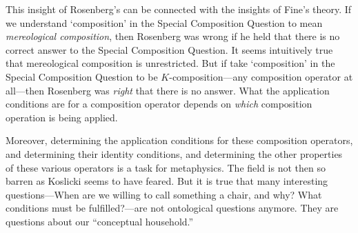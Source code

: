 \documentclass[11pt]{article}
\begin{document}
\begin{spacing}{1.5}
This insight of Rosenberg's can be connected with the insights of
Fine's theory.  If we understand `composition' in the Special
Composition Question to mean {\em mereological composition}, then
Rosenberg was wrong if he held that there is no correct answer to the
Special Composition Question.  It seems intuitively true that
mereological composition is unrestricted.  But if take `composition'
in the Special Composition Question to be $K$-composition---any
composition operator at all---then Rosenberg was {\em right} that
there is no answer.  What the application conditions are for a
composition operator depends on {\em which} composition operation is
being applied.  

Moreover, determining the application conditions for these composition
operators, and determining their identity conditions, and determining
the other properties of these various operators is a task for
metaphysics.  The field is not then so barren as Koslicki seems to
have feared.  But it is true that many interesting questions---When
are we willing to call something a chair, and why?  What conditions
must be fulfilled?---are not ontological questions anymore.  They are
questions about our ``conceptual household.''

\ifstandalone
\end{spacing}


\fi
\end{document}
